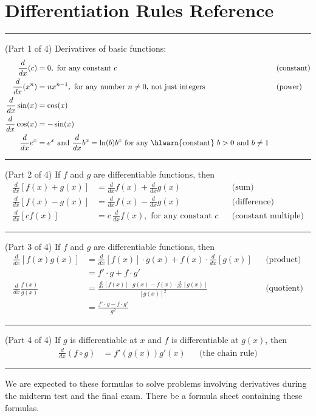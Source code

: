 \documentclass[../main.tex]{subfiles}
\begin{document}
 \section{Differentiation Rules Reference}

  \hrule
  (Part 1 of 4) Derivatives of basic functions: 
  \begin{align*}
    \frac{d}{dx} (c)
    &= 0, \text{ for any constant \(c\)}
    && \text{(constant)} \\
    \frac{d}{dx} (x^{n})
    &= n x^{n-1}, \text{ for any number \(n \ne 0\), not just integers} 
    && \text{(power)} \\
    \frac{d}{dx} \sin(x)
    &= \cos(x) \\
    \frac{d}{dx} \cos(x)
    &= -\sin(x) \\
    \frac{d}{dx} e^{x} &= e^{x} \text{ and } \frac{d}{dx}b^{x} = \ln(b)b^{x} \text{ for any \hlwarn{constant} } b > 0 \text{ and } b \ne 1
  \end{align*}

  \hrule

  (Part 2 of 4) If \(f\) and \(g\) are differentiable functions, then
  \begin{align*}
    \frac{d}{dx} [f(x) + g(x)] 
    &= \frac{d}{dx}f(x) + \frac{d}{dx}g(x)
    && \text{(sum)} \\[1em]
    \frac{d}{dx} [f(x) - g(x)] 
    &= \frac{d}{dx}f(x) - \frac{d}{dx}g(x)
    && \text{(difference)} \\[1em]
    \frac{d}{dx} [c f(x)] 
    &= c \, \frac{d}{dx} f(x), \text{ for any constant \(c\)}
    && \text{(constant multiple)}
  \end{align*}

  \hrule

  (Part 3 of 4) If \(f\) and \(g\) are differentiable functions, then
  \begin{align*}
    \frac{d}{dx} [f(x)g(x)] 
    &= { \frac{d}{dx} [f(x)] \cdot g(x)+ f(x) \cdot \frac{d}{dx}[g(x)]}
    && \text{(product)} \\
    &= f' \cdot g + f \cdot g' \\[1em]
    \frac{d}{dx} \frac{f(x)}{g(x)}
    &= {\frac{\frac{d}{dx} [f(x)] \cdot g(x) - f(x) \cdot \frac{d}{dx}[g(x)] }{ [g(x)]^{2} }}
    && \text{(quotient)} \\
    &= \frac{f' \cdot g - f \cdot g'}{g^{2}}
  \end{align*}

  \hrule

  (Part 4 of 4) If \(g\) is differentiable at \(x\) and \(f\) is differentiable at \(g(x)\), then 
  \begin{align*}
    \frac{d}{dx} (f \circ g)
    &= f'(g(x)) g'(x)
    &&\text{(the chain rule)}
  \end{align*}

  \hrule

  \faExclamationTriangle{} We are expected to  these formulas to solve problems involving derivatives during the midterm test and the final exam. There  be a formula sheet containing these formulas.
\end{document}
